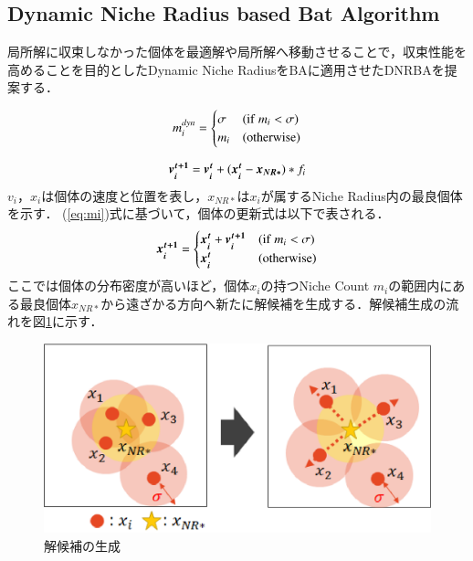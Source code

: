 \documentclass[twocolumn, a4paper]{UECIEresume}
\begin{document}
\subsection{Dynamic Niche Radius based Bat Algorithm}
局所解に収束しなかった個体を最適解や局所解へ移動させることで，収束性能を高めることを目的としたDynamic Niche RadiusをBAに適用させたDNRBAを提案する．

\begin{equation}
\label{eq:mi}
m_i^{dyn}=\begin{cases}
\sigma & ({\rm if } \ m_i < \sigma) \\
m_i & ({\rm otherwise})
\end{cases}
\end{equation}

\begin{equation}
\label{eq:dnrba-vi}
 \mbox{\boldmath $v_i^{t+1}$} = \mbox{\boldmath $v_i^t$} + (\mbox{\boldmath $x_i^t$}-\mbox{\boldmath $x_{NR*}$})*f_i
\end{equation}
$v_i$，$x_i$は個体の速度と位置を表し，$x_{NR*}$は$x_i$が属するNiche Radius内の最良個体を示す．
(\ref{eq:mi})式に基づいて，個体の更新式は以下で表される．
\begin{equation}
\label{eq:dnrba-xi}
\mbox{\boldmath $x_i^{t+1}$}=\begin{cases}
\mbox{\boldmath $x_i^t$}+\mbox{\boldmath $v_i^{t+1}$} & ({\rm if} \ m_i < \sigma) \\
\mbox{\boldmath $x_i^t$} & ({\rm otherwise})
\end{cases}
\end{equation}
ここでは個体の分布密度が高いほど，個体$x_i$の持つNiche Count $m_i$の範囲内にある最良個体$x_{NR*}$から遠ざかる方向へ新たに解候補を生成する．解候補生成の流れを図\ref{fig:nr}に示す．

\begin{figure}[h]
  \centering
  \includegraphics[width=1.0\linewidth]{eps/nr.eps}
  \caption{解候補の生成}
  \label{fig:nr}
\end{figure}
\end{document}
